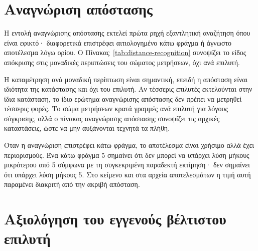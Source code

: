 \begin{table}[htbp]\centering

\caption[Αποτελέσματα ελέγχου από άκρο σε άκρο για τον κύβο 3×3×3]{Αποτελέσματα του ελέγχου από άκρο σε άκρο για πραγματικές εισόδους 3×3×3: είδος εισόδου, είδος αναγνώρισης απόστασης, μηχανή αυτόματης επίλυσης, κατάσταση αποτελέσματος και μήκος λύσης. Πηγή: τεκμήριο του  για το προφίλ .}
\label{tab:e2e-status}
\end{table}

\section{Αναγνώριση απόστασης}
\label{sec:experiments-distance}

Η εντολή αναγνώρισης απόστασης εκτελεί πρώτα ρηχή εξαντλητική αναζήτηση όπου είναι εφικτό· διαφορετικά επιστρέφει αιτιολογημένο κάτω φράγμα ή άγνωστο αποτέλεσμα λόγω ορίου. Ο Πίνακας~\ref{tab:distance-recognition} συνοψίζει το είδος απόκρισης στις μοναδικές περιπτώσεις του σώματος μετρήσεων, όχι ανά επιλυτή.

Η καταμέτρηση ανά μοναδική περίπτωση είναι σημαντική, επειδή η απόσταση είναι ιδιότητα της κατάστασης και όχι του επιλυτή. Αν τέσσερις επιλυτές εκτελούνται στην ίδια κατάσταση, το ίδιο ερώτημα αναγνώρισης απόστασης δεν πρέπει να μετρηθεί τέσσερις φορές. Το σώμα μετρήσεων κρατά γραμμές ανά επιλυτή για λόγους σύγκρισης, αλλά ο πίνακας αναγνώρισης απόστασης συνοψίζει τις αρχικές καταστάσεις, ώστε να μην αυξάνονται τεχνητά τα πλήθη.

Όταν η αναγνώριση επιστρέφει κάτω φράγμα, το αποτέλεσμα είναι χρήσιμο αλλά έχει περιορισμούς. Ένα κάτω φράγμα 5 σημαίνει ότι δεν μπορεί να υπάρχει λύση μήκους μικρότερου από 5 σύμφωνα με τη συγκεκριμένη παραδεκτή εκτίμηση· δεν σημαίνει ότι υπάρχει λύση μήκους 5. Στο κείμενο και στα αρχεία αποτελεσμάτων η τιμή αυτή παραμένει διακριτή από την ακριβή απόσταση.

\begin{table}[htbp]\centering

\caption[Σύνοψη αναγνώρισης απόστασης ανά μοναδική περίπτωση]{Σύνοψη της αναγνώρισης απόστασης ανά μοναδική περίπτωση του κύριου σώματος μετρήσεων: είδος αποτελέσματος, μέθοδος και πλήθος περιπτώσεων. Πηγή: .}
\label{tab:distance-recognition}
\end{table}

\section{Αξιολόγηση του εγγενούς βέλτιστου επιλυτή}
\label{sec:experiments-native-optimal}


